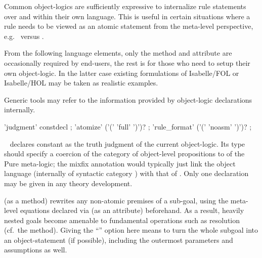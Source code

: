 \begin{isabellebody}
\begin{isamarkuptext}
  Common object-logics are sufficiently expressive to internalize rule
  statements over \isa{{\isachardoublequote}{\isasymAnd}{\isachardoublequote}} and \isa{{\isachardoublequote}{\isasymLongrightarrow}{\isachardoublequote}} within their own
  language.  This is useful in certain situations where a rule needs
  to be viewed as an atomic statement from the meta-level perspective,
  e.g.\  versus .

  From the following language elements, only the \hyperlink{method.atomize}{\mbox{}}
  method and \hyperlink{attribute.rule_format}{\mbox{}} attribute are occasionally
  required by end-users, the rest is for those who need to setup their
  own object-logic.  In the latter case existing formulations of
  Isabelle/FOL or Isabelle/HOL may be taken as realistic examples.

  Generic tools may refer to the information provided by object-logic
  declarations internally.

  \begin{rail}
    'judgment' constdecl
    ;
    'atomize' ('(' 'full' ')')?
    ;
    'rule\_format' ('(' 'noasm' ')')?
    ;
  \end{rail}

  \begin{descr}
  
  \item [\hyperlink{command.judgment}{\mbox{\isa{\isacommand{judgment}}}}~\isa{{\isachardoublequote}c\ {\isacharcolon}{\isacharcolon}\ {\isasymsigma}\ {\isacharparenleft}mx{\isacharparenright}{\isachardoublequote}}] declares
  constant  as the truth judgment of the current
  object-logic.  Its type \isa{{\isasymsigma}} should specify a coercion of the
  category of object-level propositions to  of the Pure
  meta-logic; the mixfix annotation  would typically
  just link the object language (internally of syntactic category
  ) with that of .  Only one \hyperlink{command.judgment}{\mbox{}} declaration may be given in any theory development.
  
  \item [\hyperlink{method.atomize}{\mbox{\isa{atomize}}} (as a method)] rewrites any non-atomic
  premises of a sub-goal, using the meta-level equations declared via
  \hyperlink{attribute.atomize}{\mbox{}} (as an attribute) beforehand.  As a result,
  heavily nested goals become amenable to fundamental operations such
  as resolution (cf.\ the \hyperlink{method.rule}{\mbox{}} method).  Giving the ``'' option here means to turn the whole subgoal into an
  object-statement (if possible), including the outermost parameters
  and assumptions as well.


\end{descr}
\end{isamarkuptext}
\end{isabellebody}
